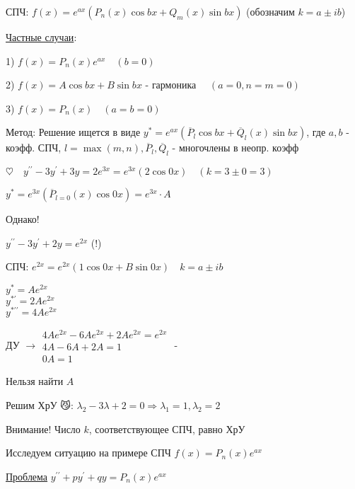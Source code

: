 \documentclass[12pt]{article}
\begin{document}
    \Def СПЧ: $f(x) = e^{ax} (P_n(x)\cos bx + Q_m (x)\sin bx)$ (обозначим $k = a \pm ib$)

    \underline{Частные случаи}:

    1) $f(x) = P_n(x) e^{ax} \quad (b = 0)$

    2) $f(x) = A\cos b x + B \sin bx$ - гармоника $\quad (a = 0, n = m = 0)$

    3) $f(x) = P_n(x) \quad (a = b = 0)$

    Метод: Решение ищется в виде $y^* = e^{ax} (\overline{P}_l \cos bx + \overline{Q}_l (x) \sin bx)$,
    где $a, b$ - коэфф. СПЧ, $l = \max(m, n), \overline{P}_l, \overline{Q}_l$ - многочлены в неопр. коэфф

     $\heartsuit \quad y^{\prime\prime} - 3y^\prime + 3y = 2e^{3x} = e^{3x} (2 \cos 0x) \quad (k = 3 \pm 0 = 3)$

    $y^* = e^{3x} (\overline{P}_{l = 0} (x) \cos 0x) = e^{3x} \cdot A$

     Однако!

    $y^{\prime\prime} - 3y^\prime + 2y = e^{2x}$ (!)

    СПЧ: $e^{2x} = e^{2x} (1 \cos 0x + B \sin 0x) \quad k = a \pm ib$

    \begin{rcases*}
    $y^* = Ae^{2x}$ \\

    $y^{*\prime} = 2Ae^{2x}$ \\

    $y^{*\prime\prime} = 4Ae^{2x}$ \\
    \end{rcases*} ДУ $\longrightarrow \begin{matrix}4Ae^{2x} - 6Ae^{2x} + 2Ae^{2x} = e^{2x} \\ 4A - 6A + 2A = 1 \\ 0A = 1\end{matrix}$ - {\Huge 🤯}

    Нельзя найти $A$

    Решим ХрУ 😼: $\lambda_2 - 3\lambda + 2 = 0 \Longrightarrow \lambda_1 = 1, \lambda_2 = 2$

    Внимание! Число $k$, соответствующее СПЧ, равно ХрУ \Cat

    \vspace{5mm}

    Исследуем ситуацию на примере СПЧ $f(x) = P_n(x) e^{ax}$

    \underline{Проблема} $y^{\prime\prime} + py^\prime + qy = P_n(x)e^{ax}$
\end{document}
